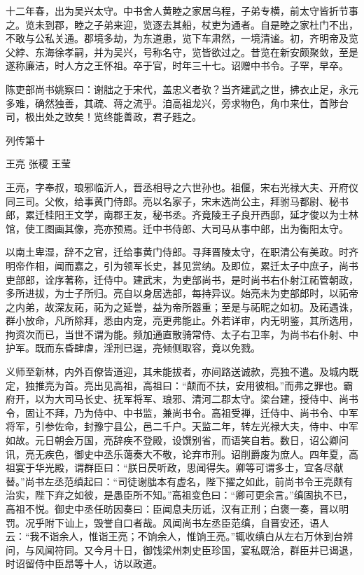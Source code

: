 \documentclass[12pt,UTF8]{ctexbook}
\begin{document}
十二年春，出为吴兴太守。中书舍人黄睦之家居乌程，子弟专横，前太守皆折节事之。览未到郡，睦之子弟来迎，览逐去其船，杖吏为通者。自是睦之家杜门不出，不敢与公私关通。郡境多劫，为东道患，览下车肃然，一境清谧。初，齐明帝及览父綍、东海徐孝嗣，并为吴兴，号称名守，览皆欲过之。昔览在新安颇聚敛，至是遂称廉洁，时人方之王怀祖。卒于官，时年三十七。诏赠中书令。子罕，早卒。

陈吏部尚书姚察曰：谢朏之于宋代，盖忠义者欤？当齐建武之世，拂衣止足，永元多难，确然独善，其疏、蒋之流乎。洎高祖龙兴，旁求物色，角巾来仕，首陟台司，极出处之致矣！览终能善政，君子韪之。





列传第十

王亮 张稷 王莹

王亮，字奉叔，琅邪临沂人，晋丞相导之六世孙也。祖偃，宋右光禄大夫、开府仪同三司。父攸，给事黄门侍郎。亮以名家子，宋末选尚公主，拜驸马都尉、秘书郎，累迁桂阳王文学，南郡王友，秘书丞。齐竟陵王子良开西邸，延才俊以为士林馆，使工图画其像，亮亦预焉。迁中书侍郎、大司马从事中郎，出为衡阳太守。

以南土卑湿，辞不之官，迁给事黄门侍郎。寻拜晋陵太守，在职清公有美政。时齐明帝作相，闻而嘉之，引为领军长史，甚见赏纳。及即位，累迁太子中庶子，尚书吏部郎，诠序著称，迁侍中。建武末，为吏部尚书，是时尚书右仆射江祏管朝政，多所进拔，为士子所归。亮自以身居选部，每持异议。始亮未为吏部郎时，以祏帝之内弟，故深友祏，祏为之延誉，益为帝所器重；至是与祏昵之如初。及祏遇诛，群小放命，凡所除拜，悉由内宠，亮更弗能止。外若详审，内无明鉴，其所选用，拘资次而已，当世不谓为能。频加通直散骑常侍、太子右卫率，为尚书右仆射、中护军。既而东昏肆虐，淫刑已逞，亮倾侧取容，竟以免戮。

义师至新林，内外百僚皆道迎，其未能拔者，亦间路送诚款，亮独不遣。及城内既定，独推亮为首。亮出见高祖，高祖曰：“颠而不扶，安用彼相。”而弗之罪也。霸府开，以为大司马长史、抚军将军、琅邪、清河二郡太守。梁台建，授侍中、尚书令，固让不拜，乃为侍中、中书监，兼尚书令。高祖受禅，迁侍中、尚书令、中军将军，引参佐命，封豫宁县公，邑二千户。天监二年，转左光禄大夫，侍中、中军如故。元日朝会万国，亮辞疾不登殿，设馔别省，而语笑自若。数日，诏公卿问讯，亮无疾色，御史中丞乐蔼奏大不敬，论弃市刑。诏削爵废为庶人。四年夏，高祖宴于华光殿，谓群臣曰：“朕日昃听政，思闻得失。卿等可谓多士，宜各尽献替。”尚书左丞范缜起曰：“司徒谢朏本有虚名，陛下擢之如此，前尚书令王亮颇有治实，陛下弃之如彼，是愚臣所不知。”高祖变色曰：“卿可更余言。”缜固执不已，高祖不悦。御史中丞任昉因奏曰：臣闻息夫历诋，汉有正刑；白褒一奏，晋以明罚。况乎附下讪上，毁誉自口者哉。风闻尚书左丞臣范缜，自晋安还，语人云：“我不诣余人，惟诣王亮；不饷余人，惟饷王亮。”辄收缜白从左右万休到台辨问，与风闻符同。又今月十日，御饯梁州刺史臣珍国，宴私既洽，群臣并已谒退，时诏留侍中臣昂等十人，访以政道。
\end{document}

